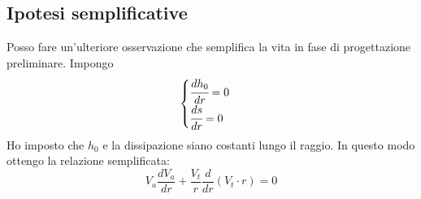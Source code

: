 \subsection{Ipotesi semplificative}
Posso fare un'ulteriore osservazione che semplifica la vita in fase di progettazione preliminare. Impongo
\begin{align*}
\begin{cases}
\cfrac{dh_0}{dr} = 0\\
\cfrac{ds}{dr} = 0 
\end{cases}
\end{align*}
Ho imposto che $h_0$ e la dissipazione siano costanti lungo il raggio. In questo modo ottengo la relazione semplificata:
\begin{equation}
\boxed{ V_a \frac{d V_a}{dr} + \frac{V_t}{r} \frac{d}{dr}(V_t \cdot r) = 0}
\label{eq:EquilibrioRadSemp}
\end{equation}
